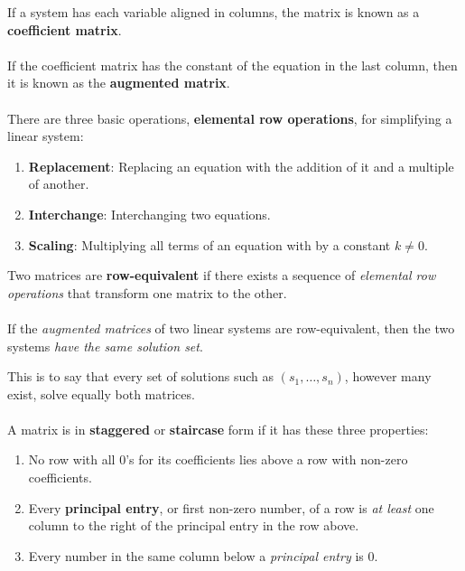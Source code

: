 \documentclass[12pt]{article}
\begin{document}
If a system has each variable aligned in columns, the matrix is known as a \textbf{coefficient matrix}. \\ \\

If the coefficient matrix has the constant of the equation in the last column, then it is known as the \textbf{augmented matrix}. \\ \\

There are three basic operations, \textbf{elemental row operations}, for simplifying a linear system:

\begin{enumerate}
    \item \textbf{Replacement}: Replacing an equation with the addition of it and a multiple of another.
    \item \textbf{Interchange}: Interchanging two equations.
    \item \textbf{Scaling}: Multiplying all terms of an equation with by a constant $k \neq 0$.
\end{enumerate}

Two matrices are \textbf{row-equivalent} if there exists a sequence of \emph{elemental row operations} that transform
one matrix to the other. \\ \\

If the \emph{augmented matrices} of two linear systems are row-equivalent, then the two systems \emph{have the same solution set}.

This is to say that every set of solutions such as $(s_1,\dots,s_n)$, however many exist, solve equally both matrices. \\ \\

A matrix is in \textbf{staggered} or \textbf{staircase} form if it has these three properties:

\begin{enumerate}
    \item No row with all $0$'s for its coefficients lies above a row with non-zero coefficients.
    \item Every \textbf{principal entry}, or first non-zero number, of a row is \emph{at least} one column to the right of the principal entry in the row above.
    \item Every number in the same column below a \emph{principal entry} is $0$.
\end{enumerate}
\end{document}
